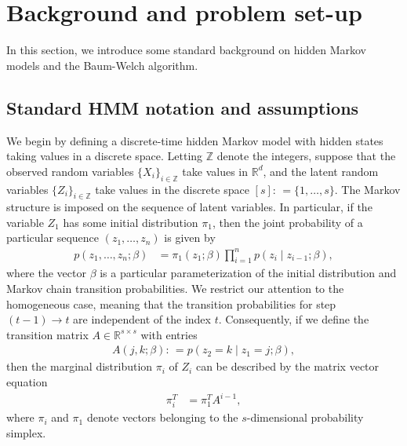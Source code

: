 \documentclass[twoside,11pt]{article}
\newcommand{\numobs}{\ensuremath{n}}
\newcommand{\usedim}{\ensuremath{d}}
\def\ZN{ \mathbb{Z} }						%
\newcommand{\nstates}{s}
\newcommand{\Tmat}{\ensuremath{A}}
\newcommand{\paramtrans}{\beta}
\newcommand{\real}{\ensuremath{\mathbb{R}}}
\newcommand{\defn}{: \, = }
\newcommand{\hprob}{\ensuremath{p}}
\begin{document}


\section{Background and problem set-up}
\label{SecBackground}

In this section, we introduce some standard background on hidden
Markov models and the Baum-Welch algorithm.


\subsection{Standard HMM notation and assumptions}
\label{SecWithSpecialCase}

We begin by defining a discrete-time hidden Markov model with hidden
states taking values in a discrete space.  Letting $\ZN$ denote the
integers, suppose that the observed random variables $\{X_i\}_{i \in
  \ZN}$ take values in $\real^\usedim$, and the latent random
variables $\{Z_i\}_{i \in \ZN}$ take values in the discrete space
$[\nstates] \defn \{1, \ldots, \nstates\}$.  The Markov structure is
imposed on the sequence of latent variables.  In particular, if the
variable $Z_1$ has some initial distribution $\pi_1$, then the joint
probability of a particular sequence $(z_1, \ldots, z_\numobs)$ is
given by
\begin{align}
\hprob(z_1, \ldots, z_\numobs; \paramtrans) & = \pi_1(z_1;
\paramtrans) \prod_{i=1}^{\numobs} \hprob(z_i \mid z_{i-1};
\paramtrans),
\end{align}
where the vector $\paramtrans$ is a particular parameterization of the
initial distribution and Markov chain transition probabilities.  We
restrict our attention to the homogeneous case, meaning that the
transition probabilities for step $(t-1) \rightarrow t$ are
independent of the index $t$.  Consequently, if we define the
transition matrix $\Tmat \in \real^{\nstates \times \nstates}$ with
entries
\begin{align*}
\Tmat(j,k ; \paramtrans) \defn \hprob(z_2 = k \mid z_1 = j; \paramtrans),
\end{align*}
then the marginal distribution $\pi_i$ of $Z_i$ can be described by
the matrix vector equation
\begin{align*}
\pi^T_i & = \pi_1^T \Tmat^{i-1},
\end{align*}
where $\pi_i$ and $\pi_1$ denote vectors belonging to the
$\nstates$-dimensional probability simplex.
\end{document}
